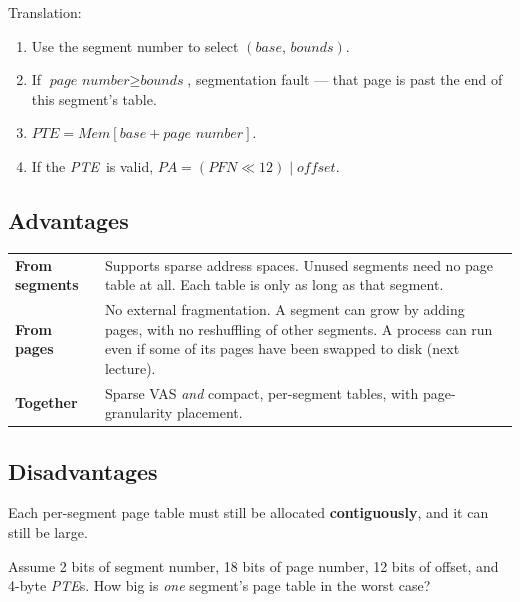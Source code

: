 \documentclass[11pt,a4paper]{article}
\newcommand{\pa}{\textit{PA}}
\newcommand{\pfn}{\textit{PFN}}
\newcommand{\pte}{\textit{PTE}}
\begin{document}
Translation:
\begin{enumerate}
  \item Use the segment number to select \((\textit{base},\,\textit{bounds})\).
  \item If \(\textit{page number} \ge \textit{bounds}\), segmentation fault
        --- that page is past the end of this segment's table.
  \item \(\pte = \textit{Mem}[\textit{base} + \textit{page number}]\).
  \item If the \pte\ is valid, \(\pa = (\pfn \ll 12) \mid \textit{offset}\).
\end{enumerate}

\subsection{Advantages}

\begin{center}
\renewcommand{\arraystretch}{1.15}
\begin{tabularx}{\textwidth}{@{}lX@{}}
  \toprule
  \textbf{From segments} & Supports sparse address spaces. Unused segments
                           need no page table at all. Each table is only
                           as long as that segment. \\
  \textbf{From pages}    & No external fragmentation. A segment can grow
                           by adding pages, with no reshuffling of other
                           segments. A process can run even if some of
                           its pages have been swapped to disk
                           (next lecture). \\
  \textbf{Together}      & Sparse VAS \emph{and} compact, per-segment
                           tables, with page-granularity placement. \\
  \bottomrule
\end{tabularx}
\end{center}

\subsection{Disadvantages}

Each per-segment page table must still be allocated
\textbf{contiguously}, and it can still be large.

\begin{quizbox}
Assume 2 bits of segment number, 18 bits of page number, 12 bits of
offset, and 4-byte \pte s. How big is \emph{one} segment's page table
in the worst case?
\end{quizbox}
\end{document}
